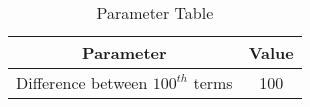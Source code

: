 
\begin{table}[ht]
  \centering
  \begin{tabular}{|c|c|}
    \hline
    Parameter & Value \\
    \hline
     Difference between $100^{th}$ terms & 100 \\
    \hline
  \end{tabular}
  \vspace{2mm}
  \caption{Parameter Table}
\end{table}

